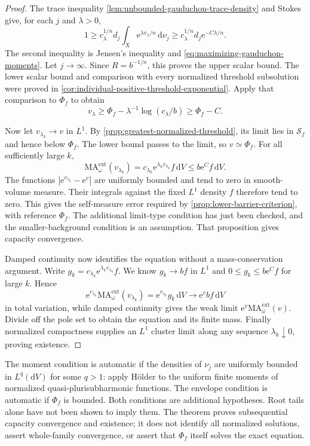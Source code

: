 \begin{proof}
The trace inequality \cref{lem:unbounded-gauduchon-trace-density} and Stokes give, for each $j$ and $\lambda>0$,
\[
 1\geq c_\lambda^{1/n}d_j
              \int_X\mathrm{e}^{\lambda v_\lambda/n}\,\mathrm{d}\nu_j
   \geq c_\lambda^{1/n}d_j\mathrm{e}^{-C\lambda/n}.
\]
The second inequality is Jensen's inequality and \eqref{eq:maximizing-gauduchon-moments}. Let $j\to\infty$. Since $R=b^{-1/n}$, this proves the upper scalar bound. The lower scalar bound and comparison with every normalized threshold subsolution were proved in \cref{cor:individual-positive-threshold-exponential}. Apply that comparison to $\Phi_f$ to obtain
\[
 v_\lambda\geq\Phi_f-\lambda^{-1}\log(c_\lambda/b)
                \geq\Phi_f-C.
\]

Now let $v_{\lambda_k}\to v$ in $L^1$. By \cref{prop:greatest-normalized-threshold}, its limit lies in $\mathcal S_f$ and hence below $\Phi_f$. The lower bound passes to the limit, so $v\simeq\Phi_f$. For all sufficiently large $k$,
\[
 \mathrm{MA}^{\mathrm{ext}}_\omega(v_{\lambda_k})
   =c_{\lambda_k}\mathrm{e}^{\lambda_k v_{\lambda_k}}f\,\mathrm{d}V
   \leq b\mathrm{e}^{C}f\,\mathrm{d}V.
\]
The functions $|\mathrm{e}^{v_{\lambda_k}}-\mathrm{e}^v|$ are uniformly bounded and tend to zero in smooth-volume measure. Their integrals against the fixed $L^1$ density $f$ therefore tend to zero. This gives the self-measure error required by \cref{prop:lower-barrier-criterion}, with reference $\Phi_f$. The additional limit-type condition has just been checked, and the smaller-background condition is an assumption. That proposition gives capacity convergence.

Damped continuity now identifies the equation without a mass-conservation argument. Write $g_k=c_{\lambda_k}\mathrm{e}^{\lambda_k v_{\lambda_k}}f$. We know $g_k\to bf$ in $L^1$ and $0\leq g_k\leq b\mathrm{e}^Cf$ for large $k$. Hence
\[
 \mathrm{e}^{v_{\lambda_k}}\mathrm{MA}^{\mathrm{ext}}_\omega(v_{\lambda_k})
   =\mathrm{e}^{v_{\lambda_k}}g_k\,\mathrm{d}V
   \longrightarrow\mathrm{e}^v bf\,\mathrm{d}V
\]
in total variation, while damped continuity gives the weak limit
$\mathrm{e}^v\mathrm{MA}^{\mathrm{ext}}_\omega(v)$. Divide off the pole set to obtain the equation and its finite mass. Finally normalized compactness supplies an $L^1$ cluster limit along any sequence $\lambda_k\downarrow0$, proving existence.
\end{proof}

The moment condition is automatic if the densities of $\nu_j$ are uniformly bounded in $L^q(\mathrm{d}V)$ for some $q>1$: apply H\"older to the uniform finite moments of normalized quasi-plurisubharmonic functions. The envelope condition is automatic if $\Phi_f$ is bounded. Both conditions are additional hypotheses. Root tails alone have not been shown to imply them. The theorem proves subsequential capacity convergence and existence; it does not identify all normalized solutions, assert whole-family convergence, or assert that $\Phi_f$ itself solves the exact equation.
